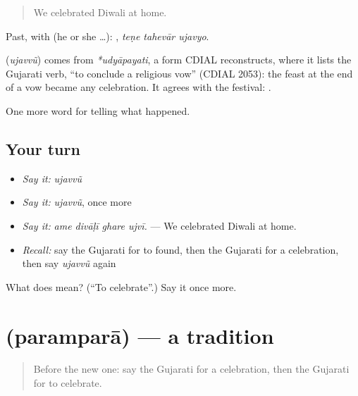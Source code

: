 \begin{quote}
We celebrated Diwali at home.
\end{quote}

Past, with  (he or she …):   , \emph{teṇe tahevār ujavyo}.

\begin{cousinweb}
\textbf{} (\emph{ujavvũ}) comes from \emph{*udyāpayati}, a form CDIAL reconstructs, where it lists the Gujarati verb, \textquotedblleft{}to conclude a religious vow\textquotedblright{} (CDIAL 2053): the feast at the end of a vow became any celebration. It agrees with the festival: \textbf{ }.
\end{cousinweb}

\begin{grammarlens}[title={What you've built}]
One more word for telling what happened.
\end{grammarlens}

\subsection*{Your turn}
\begin{itemize}
\raggedright
  \item \emph{Say it:} \emph{ujavvũ}
  \item \emph{Say it:} \emph{ujavvũ}, once more
  \item \emph{Say it:} \emph{ame divāḷī ghare ujvī.} — We celebrated Diwali at home.
  \item \emph{Recall:} say the Gujarati for to found, then the Gujarati for a celebration, then say \emph{ujavvũ} again
\end{itemize}

\begin{tcolorbox}[breakable,colback=teal!4,colframe=teal!35!black,title={Before you move on}]
What does  mean? (\textquotedblleft{}To celebrate\textquotedblright{}.) Say it once more.
\end{tcolorbox}
\section[\texorpdfstring{\gu{પરંપરા} (paramparā)}{પરંપરા (paramparā)}]{ (paramparā) — a tradition}

\label{lesson:GU-C327-parampara}



\begin{quote}
Before the new one: say the Gujarati for a celebration, then the Gujarati for to celebrate.
\end{quote}

